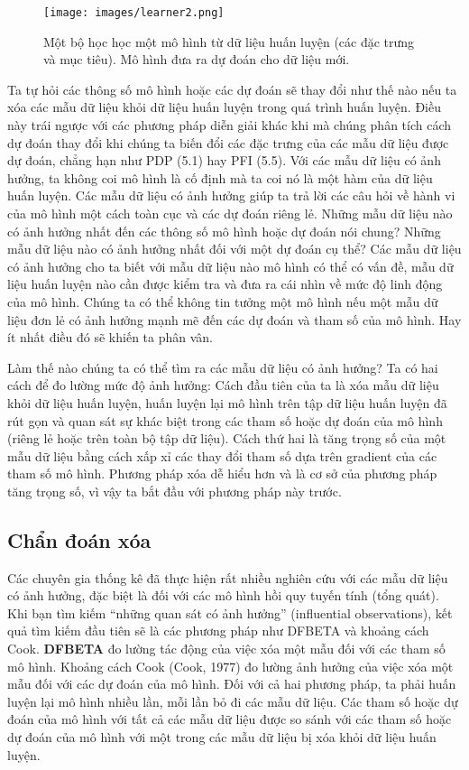 \begin{figure}[h!]
    \centering
    \texttt{[image: images/learner2.png]}
    \caption{Một bộ học học một mô hình từ dữ liệu huấn luyện (các đặc trưng và mục tiêu). Mô hình đưa ra dự đoán cho dữ liệu mới.}
    \label{fig:6_13}
\end{figure}

Ta tự hỏi các thông số mô hình hoặc các dự đoán sẽ thay đổi như thế nào nếu ta xóa các mẫu dữ liệu khỏi dữ liệu huấn luyện trong quá trình huấn luyện. Điều này trái ngược với các phương pháp diễn giải khác khi mà chúng phân tích cách dự đoán thay đổi khi chúng ta biến đổi các đặc trưng của các mẫu dữ liệu được dự đoán, chẳng hạn như PDP (5.1) hay PFI (5.5). Với các mẫu dữ liệu có ảnh hưởng, ta không coi mô hình là cố định mà ta coi nó là một hàm của dữ liệu huấn luyện. Các mẫu dữ liệu có ảnh hưởng giúp ta trả lời các câu hỏi về hành vi của mô hình một cách toàn cục và các dự đoán riêng lẻ. Những mẫu dữ liệu nào có ảnh hưởng nhất đến các thông số mô hình hoặc dự đoán nói chung? Những mẫu dữ liệu nào có ảnh hưởng nhất đối với một dự đoán cụ thể? Các mẫu dữ liệu có ảnh hưởng cho ta biết với mẫu dữ liệu nào mô hình có thể có vấn đề, mẫu dữ liệu huấn luyện nào cần được kiểm tra và đưa ra cái nhìn về mức độ linh động của mô hình. Chúng ta có thể không tin tưởng một mô hình nếu một mẫu dữ liệu đơn lẻ có ảnh hưởng mạnh mẽ đến các dự đoán và tham số của mô hình. Hay ít nhất điều đó sẽ khiến ta phân vân. 

Làm thế nào chúng ta có thể tìm ra các mẫu dữ liệu có ảnh hưởng? Ta có hai cách để đo lường mức độ ảnh hưởng: Cách đầu tiên của ta là xóa mẫu dữ liệu khỏi dữ liệu huấn luyện, huấn luyện lại mô hình trên tập dữ liệu huấn luyện đã rút gọn và quan sát sự khác biệt trong các tham số hoặc dự đoán của mô hình (riêng lẻ hoặc trên toàn bộ tập dữ liệu). Cách thứ hai là tăng trọng số của một mẫu dữ liệu bằng cách xấp xỉ các thay đổi tham số dựa trên gradient của các tham số mô hình. Phương pháp xóa dễ hiểu hơn và là cơ sở của phương pháp tăng trọng số, vì vậy ta bắt đầu với phương pháp này trước.

\subsection{Chẩn đoán xóa}

Các chuyên gia thống kê đã thực hiện rất nhiều nghiên cứu với các mẫu dữ liệu có ảnh hưởng, đặc biệt là đối với các mô hình hồi quy tuyến tính (tổng quát). Khi bạn tìm kiếm ``những quan sát có ảnh hưởng'' (influential observations), kết quả tìm kiếm đầu tiên sẽ là các phương pháp như DFBETA và khoảng cách Cook. \textbf{DFBETA} đo lường tác động của việc xóa một mẫu đối với các tham số mô hình. Khoảng cách Cook (Cook, 1977) đo lường ảnh hưởng của việc xóa một mẫu đối với các dự đoán của mô hình. Đối với cả hai phương pháp, ta phải huấn luyện lại mô hình nhiều lần, mỗi lần bỏ đi các mẫu dữ liệu. Các tham số hoặc dự đoán của mô hình với tất cả các mẫu dữ liệu được so sánh với các tham số hoặc dự đoán của mô hình với một trong các mẫu dữ liệu bị xóa khỏi dữ liệu huấn luyện.

